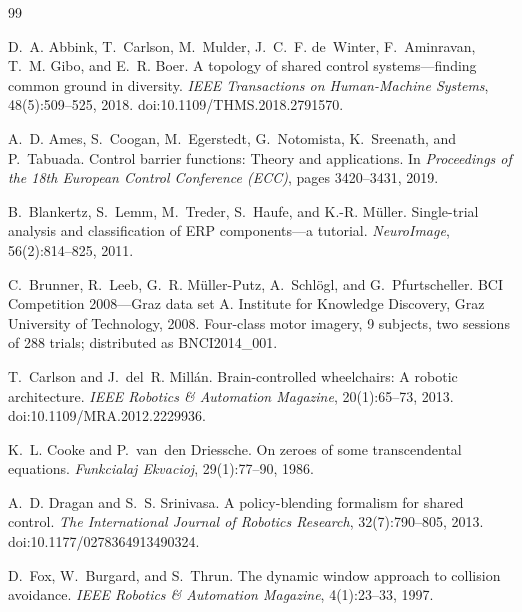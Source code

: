 \documentclass[11pt,a4paper]{article}
\theoremstyle{plain}
\theoremstyle{definition}
\begin{document}
\begin{thebibliography}{99}

D.~A. Abbink, T.~Carlson, M.~Mulder, J.~C.~F. de~Winter, F.~Aminravan,
T.~M. Gibo, and E.~R. Boer.
\newblock A topology of shared control systems---finding common ground in
  diversity.
\newblock \emph{IEEE Transactions on Human-Machine Systems},
  48(5):509--525, 2018.
\newblock doi:10.1109/THMS.2018.2791570.

A.~D. Ames, S.~Coogan, M.~Egerstedt, G.~Notomista, K.~Sreenath, and
P.~Tabuada.
\newblock Control barrier functions: Theory and applications.
\newblock In \emph{Proceedings of the 18th European Control Conference
  (ECC)}, pages 3420--3431, 2019.

B.~Blankertz, S.~Lemm, M.~Treder, S.~Haufe, and K.-R. M\"uller.
\newblock Single-trial analysis and classification of ERP
  components---a tutorial.
\newblock \emph{NeuroImage}, 56(2):814--825, 2011.

C.~Brunner, R.~Leeb, G.~R. M\"uller-Putz, A.~Schl\"ogl, and
G.~Pfurtscheller.
\newblock BCI Competition 2008---Graz data set A.
\newblock Institute for Knowledge Discovery, Graz University of
  Technology, 2008.
\newblock Four-class motor imagery, 9 subjects, two sessions of 288
  trials; distributed as BNCI2014\_001.

T.~Carlson and J.~del~R. Mill\'an.
\newblock Brain-controlled wheelchairs: A robotic architecture.
\newblock \emph{IEEE Robotics \& Automation Magazine}, 20(1):65--73,
  2013.
\newblock doi:10.1109/MRA.2012.2229936.

K.~L. Cooke and P.~van~den Driessche.
\newblock On zeroes of some transcendental equations.
\newblock \emph{Funkcialaj Ekvacioj}, 29(1):77--90, 1986.

A.~D. Dragan and S.~S. Srinivasa.
\newblock A policy-blending formalism for shared control.
\newblock \emph{The International Journal of Robotics Research},
  32(7):790--805, 2013.
\newblock doi:10.1177/0278364913490324.

D.~Fox, W.~Burgard, and S.~Thrun.
\newblock The dynamic window approach to collision avoidance.
\newblock \emph{IEEE Robotics \& Automation Magazine}, 4(1):23--33,
  1997.


\end{thebibliography}
\end{document}
